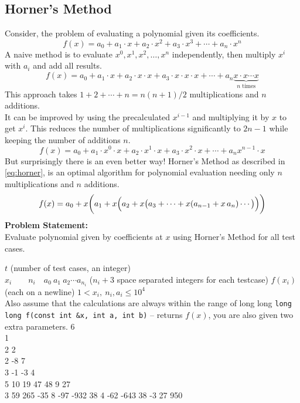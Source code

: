 \documentclass[../../Problems]{subfiles}
\begin{document}
\subsection{Horner's Method}
{\small Consider, the problem of evaluating a polynomial given its coefficients.
\begin{equation*}
	f(x)=a_{0}+a_{1}\cdot x+a_{2}\cdot x^{2}+a_{3}\cdot x^{3}+\cdots +a_{n}\cdot x^{n}
\end{equation*}
A naive method is to evaluate $x^0, x^1, x^2, \ldots, x^n$ independently, then multiply $x^i$ with $a_i$ and add all results.
\begin{equation*}
	f(x)=a_{0}+a_{1}\cdot x+a_{2}\cdot x\cdot x+a_{3}\cdot x\cdot x\cdot x+\cdots +a_{n}\underbrace{x\cdot x\cdots x}_{n\text{ times}}
\end{equation*}
This approach takes $1+2+\cdots+n=n(n+1)/2$ multiplications and $n$ additions.\\
It can be improved by using the precalculated $x^{i-1}$ and multiplying it by $x$ to get $x^{i}$. This reduces the number of multiplications significantly to $2n-1$ while keeping the number of additions $n$.
\begin{equation*}
	f(x)=a_{0}+a_{1}\cdot x^0\cdot x+a_{2}\cdot x^1\cdot x+a_{3}\cdot x^2\cdot x+\cdots +a_{n}x^{n-1}\cdot x
\end{equation*}
But surprisingly there is an even better way! Horner's Method as described in \ref{eq:horner}, is an optimal algorithm for polynomial evaluation needing only $n$ multiplications and $n$ additions.
\begin{equation}{\label{eq:horner}}
	f(x)=a_{0}+x\bigg(a_{1}+x\Big(a_{2}+x\big(a_{3}+\cdots +x(a_{n-1}+x\,a_{n})\cdots \big)\Big)\bigg)
\end{equation}
\textbf{Problem Statement:}\\
Evaluate polynomial given by coefficients at $x$ using Horner's Method for all test cases.
\begin{testcasesFunction}
	{$t$ \hfill(number of test cases, an integer)\\
	$x_i\qquad n_i \quad a_0\ a_1\ a_2 \cdots a_{n_i}$ \hfill($n_i+3$ space separated integers for each testcase)}
	{$f(x_i)$\hfill(each on a newline)}
	{$1 < x_i,\ n_i, a_i \leq 10^{4}$\\
	Also assume that the calculations are always within the range of long long}
	{\texttt{long long f(const int \&x, int a, int b)} -- returns $f(x)$, you are also given two extra parameters.}
	{6\\1\\2 2\\2 -8 7\\3 -1 -3 4\\5 10 19 47 48 9 27\\3 59 265 -35 8 -97 -932 38 4 -62 -643 38 -3 27 950}

\end{testcasesFunction}}
\end{document}
